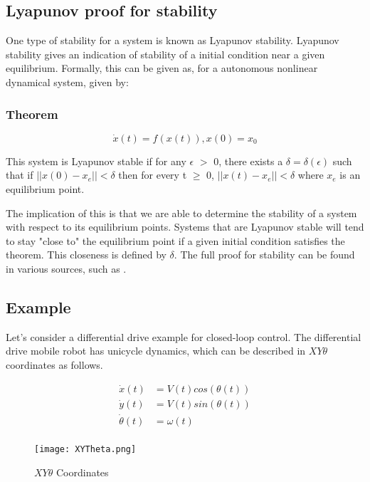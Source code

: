 \documentclass[twoside]{article}
\begin{document}
\subsection{Lyapunov proof for stability}
One type of stability for a system is known as Lyapunov stability. Lyapunov stability gives an indication of stability of a initial condition near a given equilibrium. Formally, this can be given as,
for a autonomous nonlinear dynamical system, given by:
\subsubsection{Theorem}
\begin{equation}
\dot{x} (t)=f(x(t)),   x(0) =x_0
\end{equation}

This system is Lyapunov stable if for any $\epsilon$ $>$ 0, there exists a $\delta = \delta (\epsilon)$ such that if $\vert \vert x(0) - x_e \vert \vert < \delta $ then for every t $\geq$ 0,  $\vert \vert x(t) - x_e \vert \vert < \delta$ where $x_e$ is an equilibrium point. \cite{lyupanovproof}


The implication of this is that we are able to determine the stability of a system with respect to its equilibrium points. Systems that are Lyapunov stable will tend to stay "close to" the equilibrium point if a given initial condition satisfies the theorem. This closeness is defined by $\delta$. The full proof for stability can be found in various sources, such as \cite{ee363notes}.
\subsection{Example}
Let's consider a differential drive example for closed-loop control. The differential drive mobile robot has unicycle dynamics, which can be described in $XY\theta$ coordinates as follows.

\begin{equation} \label{xytheta}
\begin{split}
\dot{x}(t) &= V(t) cos(\theta(t)) \\
\dot{y}(t) &= V(t) sin(\theta(t)) \\
\dot{\theta}(t) &= \omega(t)  \\
\end{split}
\end{equation}

\begin{figure}[h]
\centering
\texttt{[image: XYTheta.png]}
\caption{$XY\theta$ Coordinates}
\label{XYThetaFigure}
\end{figure}
\end{document}
